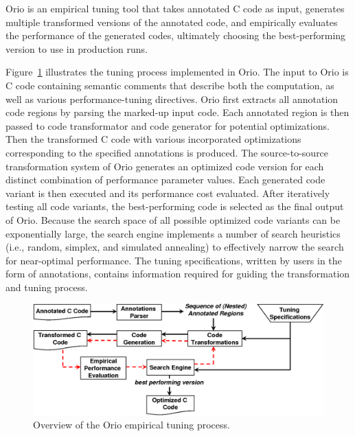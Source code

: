 \documentclass[runningheads]{llncs}
\begin{document}
Orio\cite{Norris:2007,Hartono:IPDPS09} is an empirical tuning tool that takes
annotated C code as input, generates multiple transformed versions of the
annotated code, and empirically evaluates the performance of the generated
codes, ultimately choosing the best-performing version to use in production
runs.

Figure~\ref{fig:orio} illustrates the tuning process implemented in
Orio. The input to Orio is C code containing semantic comments that
describe both the computation, as well as various performance-tuning
directives. Orio first extracts all annotation code regions by parsing
the marked-up input code. Each annotated region is then passed to code
transformator and code generator for potential optimizations. Then the
transformed C code with various incorporated optimizations
corresponding to the specified annotations is produced. The
source-to-source transformation system of Orio generates an optimized
code version for each distinct combination of performance parameter
values. Each generated code variant is then executed and its
performance cost evaluated. After iteratively testing all code
variants, the best-performing code is selected as the final output of
Orio. Because the search space of all possible optimized code variants
can be exponentially large, the search engine implements a number of
search heuristics (i.e., random, simplex, and simulated annealing) to
effectively narrow the search for near-optimal performance. The tuning
specifications, written by users in the form of annotations, contains
information required for guiding the transformation and tuning
process.

\begin{figure}[tb]
\vspace{-.1in}
\begin{center}
\includegraphics[width=.65\textwidth]{figures/orio.png}
\end{center}
\vspace{-.25in}
\caption{Overview of the Orio empirical tuning process.}
\label{fig:orio}
\end{figure}
\end{document}
